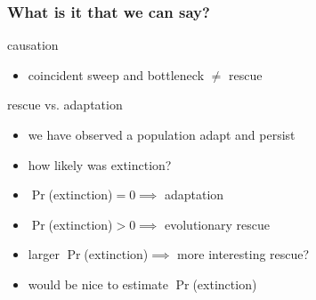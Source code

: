 \documentclass{beamer}
\begin{document}
\begin{frame}
	\frametitle{What is it that we can say?}

	\begin{alertblock}{causation}
		\begin{itemize}
			\item coincident sweep and bottleneck $\neq$ rescue \pause
		\end{itemize}
	\end{alertblock}

	\begin{alertblock}{rescue vs. adaptation}
		\begin{itemize}
			\item we have observed a population adapt and persist \pause
			\item how likely was extinction? \pause
			\pause
			\item $\Pr$(extinction)$=0 \implies$ adaptation \pause
			\item $\Pr$(extinction)$>0 \implies$ evolutionary rescue \pause
			\item larger $\Pr$(extinction)$ \implies$ more interesting rescue? \pause
			\item would be nice to estimate $\Pr$(extinction)
		\end{itemize}
	\end{alertblock}




\end{frame}

\end{document}
